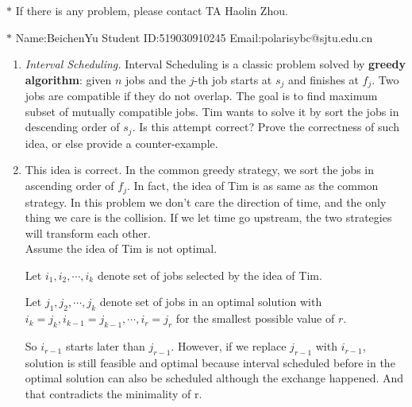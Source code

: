 \documentclass[12pt,a4paper]{article}
\makeatletter
\newtheorem*{solution}{Solution}
\theoremstyle{definition}
\renewenvironment{solution}[1][Solution] {\par\pushQED{\qed}\normalfont\topsep6\p@\@plus6\p@\relax\trivlist\item[\hskip\labelsep\bfseries#1\@addpunct{.}]\ignorespaces}{\popQED\endtrivlist\@endpefalse} \makeatother
\makeatother
\begin{document}
\noindent

\noindent{}


\begin{center}
\footnotesize{\color{red}$*$ If there is any problem, please contact TA Haolin Zhou.}\par
\footnotesize{\color{blue}$*$ Name:BeichenYu  \quad Student ID:519030910245 \quad Email:polarisybc@sjtu.edu.cn}
\end{center}

\begin{enumerate}
	\item \textit{Interval Scheduling.} Interval Scheduling is a classic problem solved by \textbf{greedy algorithm}: given $n$ jobs and the $j$-th job starts at $s_j$ and finishes at $f_j$. Two jobs are compatible if they do not overlap. The goal is to find maximum subset of mutually compatible jobs. Tim wants to solve it by sort the jobs in descending order of $s_j$. Is this attempt correct? Prove the correctness of such idea, or else provide a counter-example.
	    \begin{solution}
	        This idea is correct. In the common greedy strategy, we sort the jobs in ascending order of $f_j$. In fact, the idea of Tim is as same as the common strategy. In this problem we don't care the direction of time, and the only thing we care is the collision. If we let time go upstream, the two strategies will transform each other.\\
	        
	        Assume the idea of Tim is not optimal.
	        
	        Let $i_1,i_2,\cdots,i_k$ denote set of jobs selected by the idea of Tim.
	        
	        Let $j_1,j_2,\cdots,j_k$ denote set of jobs in an optimal solution with $i_k=j_k,i_{k-1}=j_{k-1},\cdots,i_{r}=j_r$ for the smallest possible value of $r$.
	        
	        So $i_{r-1}$ starts later than $j_{r-1}$. However, if we replace $j_{r-1}$ with $i_{r-1}$, solution is still feasible and optimal because interval scheduled before in the optimal solution can also be scheduled although the exchange happened. And that contradicts the minimality of r. 
	        

\end{solution}
\end{enumerate}
\end{document}
